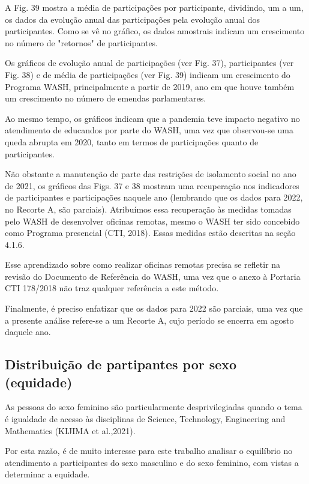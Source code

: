 A Fig. 39 mostra a média de participações por participante, dividindo, um a um, os dados da evolução anual das participações pela evolução anual dos participantes. Como se vê no gráfico, os dados amostrais indicam um crescimento no número de "retornos" de participantes.

Os gráficos de evolução anual de participações (ver Fig. 37), participantes (ver Fig. 38) e de média de participações (ver Fig. 39) indicam um crescimento do Programa WASH, principalmente a partir de 2019, ano em que houve também um crescimento no número de emendas parlamentares.

Ao mesmo tempo, os gráficos indicam que a pandemia teve impacto negativo no atendimento de educandos por parte do WASH, uma vez que observou-se uma queda abrupta em 2020, tanto em termos de participações quanto de participantes.

Não obstante a manutenção de parte das restrições de isolamento social no ano de 2021, os gráficos das Figs. 37 e 38 mostram uma recuperação nos indicadores de participantes e participações naquele ano (lembrando que os dados para 2022, no Recorte A, são parciais). Atribuímos essa recuperação às medidas tomadas pelo WASH de desenvolver oficinas remotas, mesmo o WASH ter sido concebido como Programa presencial  (CTI, 2018). Essas medidas estão descritas na seção 4.1.6.

Esse aprendizado sobre como realizar oficinas remotas precisa se refletir na revisão do Documento de Referência do WASH, uma vez que o anexo à Portaria CTI 178/2018 não traz qualquer referência a este método.

Finalmente, é preciso enfatizar que os dados para 2022 são parciais, uma vez que a presente análise refere-se a um Recorte A, cujo período se encerra em agosto daquele ano.

\subsection[Distribuição de partipantes por sexo (equidade)]{Distribuição de partipantes por sexo (equidade)}\label{Distribuição de partipantes por sexo (equidade)}
As pessoas do sexo feminino são particularmente desprivilegiadas quando o tema é igualdade de acesso às disciplinas de Science, Technology, Engineering and Mathematics (KIJIMA et al.,2021).

Por esta razão, é de muito interesse para este trabalho analisar o equilíbrio no atendimento a participantes do sexo masculino e do sexo feminino, com vistas a determinar a equidade.

